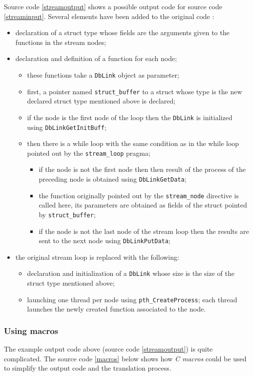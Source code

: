 \documentclass[a4paper]{article}
\begin{document}
	Source code \ref{streamoutput} shows a possible output code for source code \ref{streaminput}. Several elements have been added to the original code :
	\begin{itemize}
		\item declaration of a struct type whose fields are the arguments given to the functions in the stream nodes;
		\item declaration and definition of a function for each node; 
		\begin{itemize}
			\item these functions take a \verb+DbLink+ object as parameter;
			\item first, a pointer named \verb+struct_buffer+ to a struct whose type is the new declared struct type mentioned above is declared;
			\item if the node is the first node of the loop then the \verb+DbLink+ is initialized using \verb+DbLinkGetInitBuff+;
			\item then there is a while loop with the same condition as in the while loop pointed out by the \verb+stream_loop+ pragma;
			\begin{itemize}
				\item if the node is not the first node then then result of the process of the preceding node is obtained using \verb+DbLinkGetData+;
				\item the function originally pointed out by the \verb+stream_node+ directive is called here, its parameters are obtained as fields of the struct pointed by \verb+struct_buffer+;
				\item if the node is not the last node of the stream loop then the results are sent to the next node using \verb+DbLinkPutData+;
			\end{itemize}
		\end{itemize}
		\item the original stream loop is replaced with the following:
		\begin{itemize}
			\item declaration and initialization of a \verb+DbLink+ whose size is the size of the struct type mentioned above;
			\item launching one thread per node using \verb+pth_CreateProcess+; each thread launches the newly created function associated to the node.
		\end{itemize}
	\end{itemize}
	
	\subsubsection{Using macros}
	The example output code above (source code \ref{streamoutput}) is quite complicated. The source code \ref{macros} below shows how \emph{C macros} could be used to simplify the output code and the translation process.
	
\end{document}
